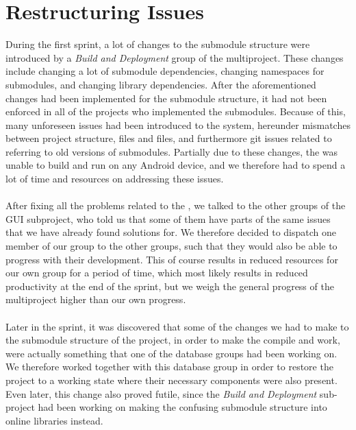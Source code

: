 \section{Restructuring Issues}
\label{sec:restructuring_issues}


During the first sprint, a lot of changes to the submodule structure were introduced by a \emph{Build and Deployment} group of the multiproject. These changes include changing a lot of submodule dependencies, changing namespaces for submodules, and changing library dependencies. After the aforementioned changes had been implemented for the submodule structure, it had not been enforced in all of the \giraf projects who implemented the submodules. Because of this, many unforeseen issues had been introduced to the system, hereunder mismatches between project structure,  files and  files, and furthermore git issues related to referring to old versions of submodules. Partially due to these changes, the \ct was unable to build and run on any Android device, and we therefore had to spend a lot of time and resources on addressing these issues. 
\\\\
After fixing all the problems related to the \ct, we talked to the other groups of the GUI subproject, who told us that some of them have parts of the same issues that we have already found solutions for. We therefore decided to dispatch one member of our group to the other groups, such that they would also be able to progress with their development. This of course results in reduced resources for our own group for a period of time, which most likely results in reduced productivity at the end of the sprint, but we weigh the general progress of the multiproject higher than our own progress.
\\\\
Later in the sprint, it was discovered that some of the changes we had to make to the submodule structure of the project, in order to make the \ct compile and work, were actually something that one of the database groups had been working on. We therefore worked together with this database group in order to restore the project to a working state where their necessary components were also present. Even later, this change also proved futile, since the \emph{Build and Deployment} sub-project had been working on making the confusing submodule structure into online libraries instead. 

